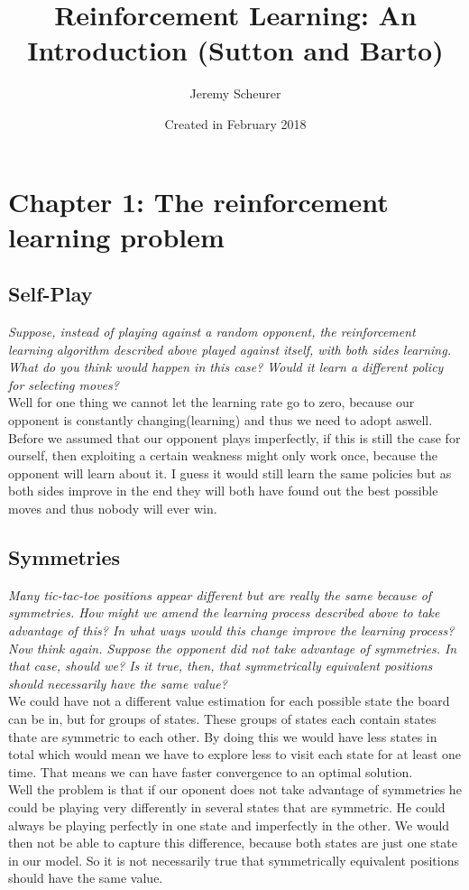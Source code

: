 \documentclass[12pt,a4paper]{article}
\author{Jeremy Scheurer}
\title{Reinforcement Learning: An Introduction (Sutton and Barto)}
\date{Created in February 2018}
\begin{document}
\maketitle
\tableofcontents
\newpage
	
\section{Chapter 1: The reinforcement learning problem}
\subsection{Self-Play }
\textit{Suppose, instead of playing against a random opponent, the reinforcement learning algorithm 		described above played against itself, with both sides learning. What do you think would happen in this case? Would it learn a different policy for selecting moves?}\\

Well for one thing we cannot let the learning rate go to zero, because our opponent is constantly changing(learning) and thus we need to adopt aswell. Before we assumed that our opponent plays imperfectly, if this is still the case for ourself, then exploiting a certain weakness might only work once, because the opponent will learn about it. I guess it would still learn the same policies but as both sides improve in the end they will both have found out the best possible moves and thus nobody will ever win.

\subsection{Symmetries}
\textit{Many tic-tac-toe positions appear different but are really the same because of symmetries. How might we amend the learning process described above to take advantage of this? In what ways would this change improve the learning process? Now think again. Suppose the opponent did not take advantage of symmetries. In that case, should we? Is it true, then, that symmetrically equivalent positions should necessarily have the same value?} \\ 

We could have not a different value estimation for each possible state the board can be in, but for groups of states. These groups of states each contain states thate are symmetric to each other. By doing this we would have less states in total which would mean we have to explore less to visit each state for at least one time. That means we can have faster convergence to an optimal solution. \\
Well the problem is that if our oponent does not take advantage of symmetries he could be playing very differently in several states that are symmetric. He could always be playing perfectly in one state and imperfectly in the other. We would then not be able to capture this difference, because both states are just one state in our model. So it is not necessarily true that symmetrically equivalent positions should have the same value.
\end{document}
